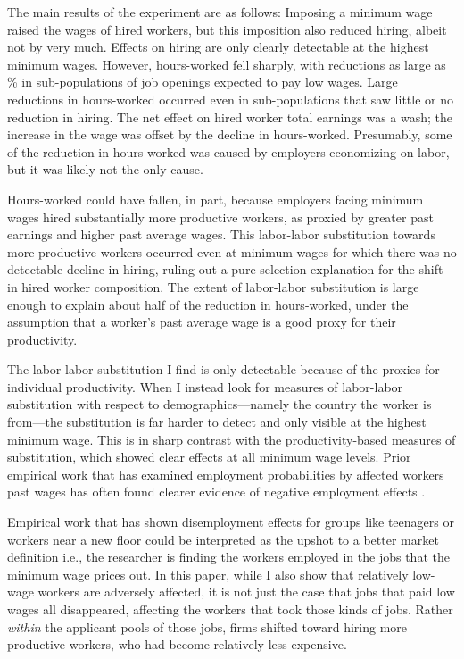 \documentclass[AER]{AEA}
\begin{document}
The main results of the experiment are as follows:
Imposing a minimum wage raised the wages of hired workers, but this imposition also reduced hiring, albeit not by very much.
Effects on hiring are only clearly detectable at the highest minimum wages.
However, hours-worked fell sharply, with reductions as large as \HoursReduction{}\% in sub-populations of job openings expected to pay low wages.
Large reductions in hours-worked occurred even in sub-populations that saw little or no reduction in hiring. 
The net effect on hired worker total earnings was a wash; the increase in the wage was offset by the decline in hours-worked.
Presumably, some of the reduction in hours-worked was caused by employers economizing on labor, but it was likely not the only cause.  

Hours-worked could have fallen, in part, because employers facing minimum wages hired substantially more productive workers, as proxied by greater past earnings and higher past average wages. 
This labor-labor substitution towards more productive workers occurred even at minimum wages for which there was no detectable decline in hiring, ruling out a pure selection explanation for the shift in hired worker composition.
The extent of labor-labor substitution is large enough to explain about half of the reduction in hours-worked, under the assumption that a worker's past average wage is a good proxy for their productivity.

The labor-labor substitution I find is only detectable because of the proxies for individual productivity.
When I instead look for measures of labor-labor substitution with respect to demographics---namely the country the worker is from---the substitution is far harder to detect and only visible at the highest minimum wage. 
This is in sharp contrast with the productivity-based measures of substitution, which showed clear effects at all minimum wage levels.
Prior empirical work that has examined employment probabilities by affected workers past wages has often found clearer evidence of negative employment effects \citep{abowd2000}.

Empirical work that has shown disemployment effects for groups like teenagers or workers near a new floor could be interpreted as the upshot to a better market definition i.e., the researcher is finding the workers employed in the jobs that the minimum wage prices out.
In this paper, while I also show that relatively low-wage workers are adversely affected, it is not just the case that jobs that paid low wages all disappeared, affecting the workers that took those kinds of jobs.
Rather \emph{within} the applicant pools of those jobs, firms shifted toward hiring more productive workers, who had become relatively less expensive. 
\end{document}
